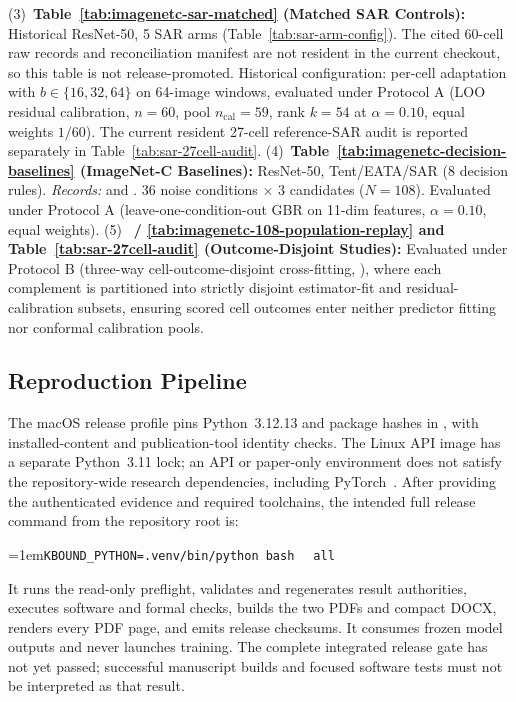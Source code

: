 {(3)~\textbf{Table~\ref{tab:imagenetc-sar-matched} (Matched SAR Controls):} Historical ResNet-50, 5 SAR arms (Table~\ref{tab:sar-arm-config}). The cited 60-cell raw records and reconciliation manifest are not resident in the current checkout, so this table is not release-promoted. Historical configuration: per-cell adaptation with $b \in \{16, 32, 64\}$ on 64-image windows, evaluated under Protocol A (LOO residual calibration, $n=60$, pool $n_{\mathrm{cal}} = 59$, rank $k = 54$ at $\alpha=0.10$, equal weights $1/60$). The current resident 27-cell reference-SAR audit is reported separately in Table~\ref{tab:sar-27cell-audit}.
(4)~\textbf{Table~\ref{tab:imagenetc-decision-baselines} (ImageNet-C Baselines):} ResNet-50, Tent/EATA/SAR (8 decision rules). \emph{Records:}  and . 36 noise conditions $\times$ 3 candidates ($N=108$). Evaluated under Protocol A (leave-one-condition-out GBR on 11-dim features, $\alpha=0.10$, equal weights).
(5)~\textbf{ / \ref{tab:imagenetc-108-population-replay} and Table~\ref{tab:sar-27cell-audit} (Outcome-Disjoint Studies):} Evaluated under Protocol B (three-way cell-outcome-disjoint cross-fitting, ), where each complement is partitioned into strictly disjoint estimator-fit and residual-calibration subsets, ensuring scored cell outcomes enter neither predictor fitting nor conformal calibration pools.}

\subsection{Reproduction Pipeline}

The macOS release profile pins Python~3.12.13 and package hashes in
, with installed-content and
publication-tool identity checks. The Linux API image has a separate
Python~3.11 lock; an API or paper-only environment does not satisfy the
repository-wide research dependencies, including PyTorch~\cite{paszke2019pytorch}.
After providing the authenticated evidence and required toolchains, the intended
full release command from the repository root is:
\par\vspace{1pt}\noindent\hangindent=1em{\small\texttt{KBOUND\_PYTHON=.venv/bin/python bash }%
\texttt{ all}}\par\vspace{1pt}
It runs the read-only preflight, validates and regenerates result authorities, executes software and
formal checks, builds the two PDFs and compact DOCX, renders every PDF page, and emits release
checksums. It consumes frozen model outputs and never launches training.
The complete integrated release gate has not yet passed; successful manuscript
builds and focused software tests must not be interpreted as that result.

